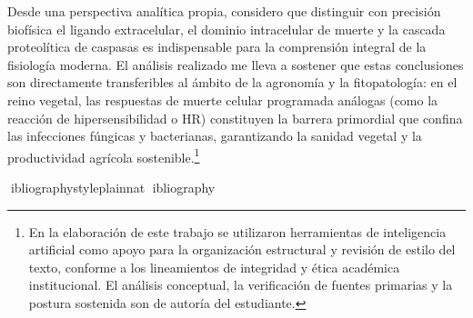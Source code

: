 \documentclass[spanish,letterpaper,oneside]{article}
\begin{document}
Desde una perspectiva analítica propia, considero que distinguir con precisión biofísica el ligando extracelular, el dominio intracelular de muerte y la cascada proteolítica de caspasas es indispensable para la comprensión integral de la fisiología moderna. El análisis realizado me lleva a sostener que estas conclusiones son directamente transferibles al ámbito de la agronomía y la fitopatología: en el reino vegetal, las respuestas de muerte celular programada análogas (como la reacción de hipersensibilidad o HR) constituyen la barrera primordial que confina las infecciones fúngicas y bacterianas, garantizando la sanidad vegetal y la productividad agrícola sostenible.\footnote{En la elaboración de este trabajo se utilizaron herramientas de inteligencia artificial como apoyo para la organización estructural y revisión de estilo del texto, conforme a los lineamientos de integridad y ética académica institucional. El análisis conceptual, la verificación de fuentes primarias y la postura sostenida son de autoría del estudiante.}

\clearpage
ibliographystyle{plainnat}
ibliography{}
\end{document}
